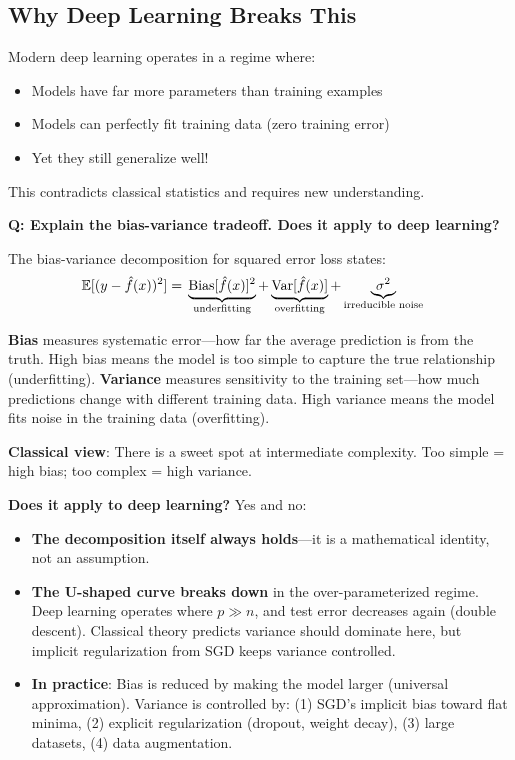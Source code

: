 \subsection{Why Deep Learning Breaks This}

Modern deep learning operates in a regime where:
\begin{itemize}
    \item Models have far more parameters than training examples
    \item Models can perfectly fit training data (zero training error)
    \item Yet they still generalize well!
\end{itemize}

This contradicts classical statistics and requires new understanding.

\begin{interviewq}
\textbf{Q: Explain the bias-variance tradeoff. Does it apply to deep learning?}

 \quad {} \quad \badgefreq{\freqhigh}

\stronganswer
The bias-variance decomposition for squared error loss states:
\begin{align*}
\operatorname{\mathbb{E}}[(y - \hat{f}(x))^2] = \; &\underbrace{\text{Bias}[\hat{f}(x)]^2}_{\text{underfitting}} + \underbrace{\operatorname{Var}[\hat{f}(x)]}_{\text{overfitting}} + \underbrace{\sigma^2}_{\text{irreducible noise}}
\end{align*}

\textbf{Bias} measures systematic error---how far the average prediction is from the truth. High bias means the model is too simple to capture the true relationship (underfitting). \textbf{Variance} measures sensitivity to the training set---how much predictions change with different training data. High variance means the model fits noise in the training data (overfitting).

\textbf{Classical view}: There is a sweet spot at intermediate complexity. Too simple = high bias; too complex = high variance.

\textbf{Does it apply to deep learning?} Yes and no:
\begin{itemize}
    \item \textbf{The decomposition itself always holds}---it is a mathematical identity, not an assumption.
    \item \textbf{The U-shaped curve breaks down} in the over-parameterized regime. Deep learning operates where $p \gg n$, and test error decreases again (double descent). Classical theory predicts variance should dominate here, but implicit regularization from SGD keeps variance controlled.
    \item \textbf{In practice}: Bias is reduced by making the model larger (universal approximation). Variance is controlled by: (1) SGD's implicit bias toward flat minima, (2) explicit regularization (dropout, weight decay), (3) large datasets, (4) data augmentation.
\end{itemize}


\end{interviewq}
